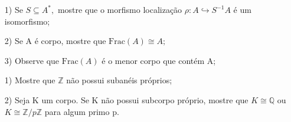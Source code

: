 \documentclass[algebraII_notes.tex]{subfiles}
\begin{document}
\begin{prop*}[Exercício]
	\begin{itemize}
		\item[1)] Se \(S\subseteq A^{*},\) mostre que o morfismo localização \(\rho :A\hookrightarrow S^{-1}A\) é um isomorfismo;
		\item[2)] Se A é corpo, mostre que \(\mathrm{Frac}(A)\cong{A;}\)
		\item[3)] Observe que \(\mathrm{Frac}(A)\) é o menor corpo que contém A;
	\end{itemize}
\end{prop*}
\begin{example}[Exercício]
	\begin{itemize}
		\item[1)] Mostre que \(\mathbb{Z}\) não possui subanéis próprios;
		\item[2)] Seja K um corpo. Se K não possui subcorpo próprio, mostre que \(K\cong{\mathbb{Q}}\) ou
		      \(K\cong{\mathbb{Z}/p \mathbb{Z}}\) para algum primo p.
	\end{itemize}
\end{example}
\end{document}
